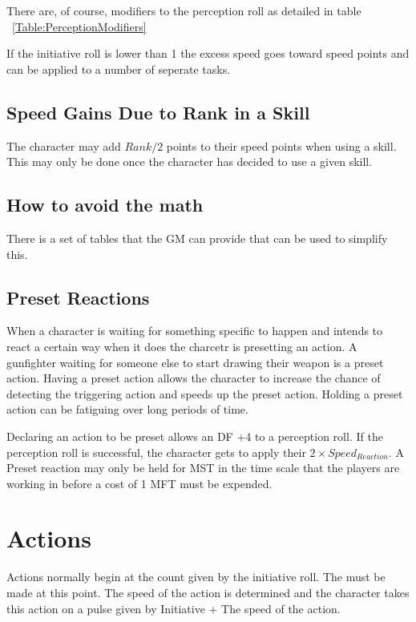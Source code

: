 There are, of course, modifiers to the perception roll as detailed in table 
~\ref{Table:PerceptionModifiers}

If the initiative roll is lower than 1 the excess speed goes toward speed points 
and can be applied to a number of seperate tasks.

\subsection{Speed Gains Due to Rank in a Skill}

The character may add \( Rank/2 \) points to their speed points when using a
skill. This may only be done once the character has decided to use a
given skill. 

\subsection{How to avoid the math}

There is a set of tables that the GM can provide that can be used to
simplify this. 

\subsection{Preset Reactions}

When a character is waiting for something specific to happen and intends to react a certain 
way when it does the charcetr is presetting an action. A gunfighter waiting for someone else 
to start drawing their weapon is a preset action. Having a preset action allows the character to increase
the chance of detecting the triggering action and speeds up the preset action. 
Holding a preset action can be fatiguing over long periods of time.

Declaring an action to be preset allows an DF +4 to a perception roll. If the perception roll is successful, the 
character gets to apply their $ 2 \times Speed_{Reaction} $. A Preset reaction may only be held for MST 
in the time scale that the players are working in before a cost of 1 MFT must be expended.

\section{Actions}

Actions normally begin at the count given by the initiative roll. The 
must be made at this point. The speed of the action is determined and 
the character takes this action on a pulse given by Initiative + The speed of the action.  

